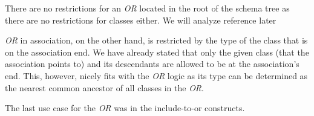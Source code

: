 There are no restrictions for an \textit{OR} located in the root of the schema tree as there are no restrictions for classes either. We will analyze reference later

\textit{OR} in association, on the other hand, is restricted by the type of the class that is on the association end. We have already stated that only the given class (that the association points to) and its descendants are allowed to be at the association's end. This, however, nicely fits with the \textit{OR} logic as its type can be determined as the nearest common ancestor of all classes in the \textit{OR}.

The last use case for the \textit{OR} was in the include-to-or constructs.




